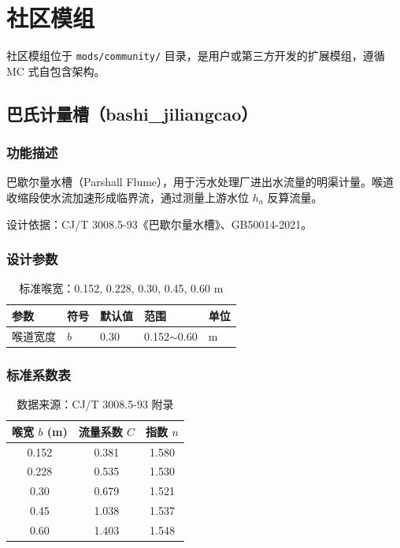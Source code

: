 \documentclass[12pt,a4paper]{ctexart}
\begin{document}
\newpage

\section{社区模组}

社区模组位于 \texttt{mods/community/} 目录，是用户或第三方开发的扩展模组，遵循 MC 式自包含架构。

\subsection{巴氏计量槽（bashi\_jiliangcao）}

\subsubsection{功能描述}
巴歇尔量水槽（Parshall Flume），用于污水处理厂进出水流量的明渠计量。喉道收缩段使水流加速形成临界流，通过测量上游水位 $h_a$ 反算流量。

设计依据：CJ/T 3008.5-93《巴歇尔量水槽》、GB50014-2021。

\subsubsection{设计参数}
\begin{table}[h]
\centering
\begin{tabular}{@{}lllll@{}}
\toprule
参数 & 符号 & 默认值 & 范围 & 单位 \\
\midrule
喉道宽度 & $b$ & 0.30 & 0.152$\sim$0.60 & m \\
\bottomrule
\end{tabular}
\caption{标准喉宽：0.152, 0.228, 0.30, 0.45, 0.60 m}
\end{table}

\subsubsection{标准系数表}

\begin{table}[h]
\centering
\begin{tabular}{@{}ccc@{}}
\toprule
喉宽 $b$ (m) & 流量系数 $C$ & 指数 $n$ \\
\midrule
0.152 & 0.381  & 1.580 \\
0.228 & 0.535  & 1.530 \\
0.30  & 0.679  & 1.521 \\
0.45  & 1.038  & 1.537 \\
0.60  & 1.403  & 1.548 \\
\bottomrule
\end{tabular}
\caption{数据来源：CJ/T 3008.5-93 附录}
\end{table}
\end{document}
